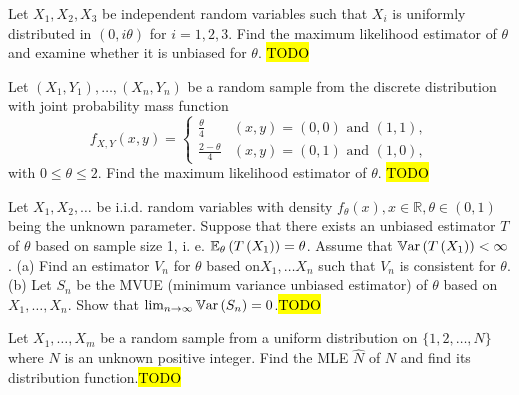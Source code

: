 \begin{example}
\label{exa:isi2005samplepsb9}Let $X_{1},X_{2},X_{3}$ be independent
random variables such that $X_{i}$ is uniformly distributed in $(0,i\theta)$
for $i=1,2,3$. Find the maximum likelihood estimator of $\theta$
and examine whether it is unbiased for $\theta$. \hl{TODO}
\end{example}

\begin{example}
\label{exa:isi2006samplepsb8}Let $\left(X_{1},Y_{1}\right),\ldots,\left(X_{n},Y_{n}\right)$
be a random sample from the discrete distribution with joint probability
mass function 
\[
f_{X,Y}(x,y)=\begin{cases}
\frac{\theta}{4} & (x,y)=(0,0)\text{ and }(1,1),\\
\frac{2-\theta}{4} & (x,y)=(0,1)\text{ and }(1,0),
\end{cases}
\]
 with $0\leq\theta\leq2$. Find the maximum likelihood estimator of
$\theta$. \hl{TODO}
\end{example}

\begin{example}
\label{exa:isi2006samplepsb9}Let $X_{1},X_{2},\ldots$ be i.i.d.
random variables with density $f_{\theta}(x),x\in\mathbb{R},\theta\in(0,1)$
being the unknown parameter. Suppose that there exists an unbiased
estimator $T$ of $\theta$ based on sample size 1, i. e. $\mathbb{E}_{\theta}\left(T\left(X_{1}\right)\right)=\theta$.
Assume that $\mathbb{V\mathrm{ar}}\left(T\left(X_{1}\right)\right)<\infty$. (a) Find
an estimator $V_{n}$ for $\theta$ based on$X_{1},\ldots X_{n}$
such that $V_{n}$ is consistent for $\theta$. (b) Let $S_{n}$ be
the MVUE (minimum variance unbiased estimator) of $\theta$ based
on $X_{1},\ldots,X_{n}$. Show that $\lim_{n\rightarrow\infty}\mathbb{V\mathrm{ar}}\left(S_{n}\right)=0$.\hl{TODO}
\end{example}

\begin{example}
\label{exa:isi2008samplepsb9}Let $X_{1},\ldots,X_{m}$ be a random
sample from a uniform distribution on $\{1,2,\ldots,N\}$ where $N$
is an unknown positive integer. Find the MLE $\widehat{N}$ of $N$
and find its distribution function.\hl{TODO}
\end{example}


